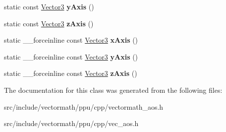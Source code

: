 \begin{DoxyCompactItemize}
\item 
\hypertarget{classVectormath_1_1Aos_1_1Vector3_a294d0afafac74a08da052b0634933c8d}{static const \hyperlink{classVectormath_1_1Aos_1_1Vector3}{Vector3} {\bfseries y\-Axis} ()}\label{classVectormath_1_1Aos_1_1Vector3_a294d0afafac74a08da052b0634933c8d}

\item 
\hypertarget{classVectormath_1_1Aos_1_1Vector3_adb1dcbe829b75d5a1b6e57e7dc283394}{static const \hyperlink{classVectormath_1_1Aos_1_1Vector3}{Vector3} {\bfseries z\-Axis} ()}\label{classVectormath_1_1Aos_1_1Vector3_adb1dcbe829b75d5a1b6e57e7dc283394}

\item 
\hypertarget{classVectormath_1_1Aos_1_1Vector3_a54c000c5895b54b8f74c10ddfa29114d}{static \-\_\-\-\_\-forceinline const \hyperlink{classVectormath_1_1Aos_1_1Vector3}{Vector3} {\bfseries x\-Axis} ()}\label{classVectormath_1_1Aos_1_1Vector3_a54c000c5895b54b8f74c10ddfa29114d}

\item 
\hypertarget{classVectormath_1_1Aos_1_1Vector3_aca57ff5da23a971af9e91dc344581b08}{static \-\_\-\-\_\-forceinline const \hyperlink{classVectormath_1_1Aos_1_1Vector3}{Vector3} {\bfseries y\-Axis} ()}\label{classVectormath_1_1Aos_1_1Vector3_aca57ff5da23a971af9e91dc344581b08}

\item 
\hypertarget{classVectormath_1_1Aos_1_1Vector3_ad3eb745e15de237c0e3d2708d135abab}{static \-\_\-\-\_\-forceinline const \hyperlink{classVectormath_1_1Aos_1_1Vector3}{Vector3} {\bfseries z\-Axis} ()}\label{classVectormath_1_1Aos_1_1Vector3_ad3eb745e15de237c0e3d2708d135abab}

\end{DoxyCompactItemize}


The documentation for this class was generated from the following files\-:\begin{DoxyCompactItemize}
\item 
src/include/vectormath/ppu/cpp/vectormath\-\_\-aos.\-h\item 
src/include/vectormath/ppu/cpp/vec\-\_\-aos.\-h\end{DoxyCompactItemize}

